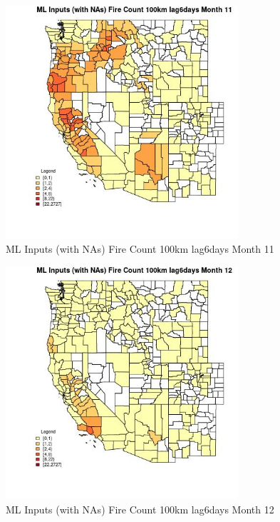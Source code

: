 \begin{figure} 
\centering  
\includegraphics[width=0.77\textwidth]{Code_Outputs/Report_ML_input_PM25_Step4_part_f_de_duplicated_aveswNAs_CountyFire_Count_100km_lag6daysmedianMonth11.jpg} 
\caption{\label{fig:Report_ML_input_PM25_Step4_part_f_de_duplicated_aveswNAsCountyFire_Count_100km_lag6daysmedianMonth11}ML Inputs (with NAs) Fire Count 100km lag6days Month 11} 
\end{figure} 
 

\begin{figure} 
\centering  
\includegraphics[width=0.77\textwidth]{Code_Outputs/Report_ML_input_PM25_Step4_part_f_de_duplicated_aveswNAs_CountyFire_Count_100km_lag6daysmedianMonth12.jpg} 
\caption{\label{fig:Report_ML_input_PM25_Step4_part_f_de_duplicated_aveswNAsCountyFire_Count_100km_lag6daysmedianMonth12}ML Inputs (with NAs) Fire Count 100km lag6days Month 12} 
\end{figure} 
 

